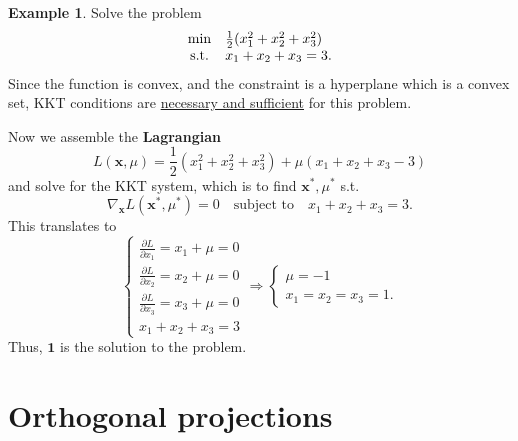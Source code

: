 \documentclass[12pt]{report}
\theoremstyle{definition}
\begin{document}
\newtheorem{KKT LCPI example}[theorem]{Example}
\begin{KKT LCPI example}
    Solve the problem
    \begin{equation*}
        \begin{array}{c @{\quad} l}
            \min & \frac{1}{2}(x_1^2+x_2^2+x_3^2) \\
            \text{s.t.} & x_1+x_2+x_3=3.
        \end{array} 
    \end{equation*} 
    Since the function is convex, and the constraint is a hyperplane which is a
    convex set, KKT conditions are \underline{necessary and sufficient} for this problem.

    \medskip\noindent
    Now we assemble the \textbf{Lagrangian}
    \[
        L(\mathbf{x},\mu)=\frac{1}{2}(x_1^2+x_2^2+x_3^2)+\mu(x_1+x_2+x_3-3)
    \]
    and solve for the KKT system, which is to find $\mathbf{x}^*, \mu^*$ s.t.
    \[
        \nabla_\mathbf{x}L(\mathbf{x}^*,\mu^*)=0
        \quad\text{subject to}\quad
        x_1+x_2+x_3=3.
    \]
    This translates to
    \[
        \begin{cases}
            \frac{\partial L}{\partial x_1}=x_1+\mu=0 \\
            \frac{\partial L}{\partial x_2}=x_2+\mu=0 \\
            \frac{\partial L}{\partial x_3}=x_3+\mu=0 \\
            x_1+x_2+x_3=3
        \end{cases}
        \Longrightarrow
        \begin{cases}
            \mu=-1 \\
            x_1=x_2=x_3=1.
        \end{cases}
    \]
    Thus, $\mathbf{1}$ is the solution to the problem.
\end{KKT LCPI example}

\section{Orthogonal projections}
\end{document}
